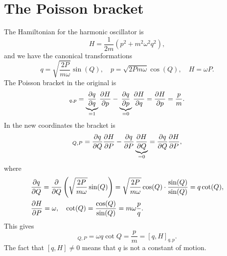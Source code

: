 \documentclass{article}
\begin{document}
    \section{The Poisson bracket}
        The Hamiltonian for the harmonic oscillator is
        \begin{equation*}
            H = \frac{1}{2m} \left(p^2 + m^2 \omega^2 q^2\right),
        \end{equation*}
        and we have the canonical transformations
        \begin{equation*}
            q = \sqrt{\frac{2P}{m \omega}} \sin(Q), \quad p = \sqrt{2 P m \omega} \cos(Q), \quad H = \omega P.
        \end{equation*}
        The Poisson bracket in the original is
        \begin{equation*}
            [q, H]_{q, p} = \underbrace{\pdv{q}{q}}_{=1}\pdv{H}{p} - \underbrace{\pdv{q}{p}}_{=0}\pdv{H}{q} = \pdv{H}{p} = \frac{p}{m}.
        \end{equation*} 
        In the new coordinates the bracket is
        \begin{equation*}
            [q, H]_{Q, P} = \pdv{q}{Q}\pdv{H}{P} - \pdv{q}{P} \underbrace{\pdv{H}{Q}}_{= 0} = \pdv{q}{Q}\pdv{H}{P},
        \end{equation*}
        where
        \begin{align*}
            & \pdv{q}{Q} = \pdv{Q}\left(\sqrt{\frac{2P}{m \omega}} \sin(Q)\right) = \sqrt{\frac{2P}{m \omega}} \cos(Q) \cdot \frac{\sin(Q)}{\sin(Q)} = q \cot(Q), \\
            & \pdv{H}{P} = \omega, \quad \cot(Q) = \frac{\cos(Q)}{\sin(Q)} = m \omega \frac{p}{q}.
        \end{align*}
        This gives 
        \begin{equation*}
            [q, H]_{Q, P} = \omega q \cot{Q} = \frac{p}{m} = [q, H]_{q, p}.
        \end{equation*}
        The fact that $[q, H] \neq 0$ means that $q$ is not a constant of motion.
\end{document}
